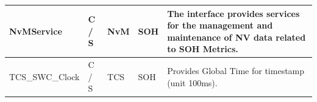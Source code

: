 \begin{longtable}{|l|l|l|l|l|}
\begin{minipage}{0.39\linewidth}\raggedright\vspace{.75ex}NvMService\vspace{.75ex}\end{minipage} & \begin{minipage}{0.07\linewidth}\raggedright\vspace{.75ex}C / S\vspace{.75ex}\end{minipage} & \begin{minipage}{0.11\linewidth}\raggedright\vspace{.75ex}NvM\vspace{.75ex}\end{minipage} & \begin{minipage}{0.11\linewidth}\raggedright\vspace{.75ex}SOH\vspace{.75ex}\end{minipage} & \begin{minipage}{0.16\linewidth}\raggedright\vspace{.75ex}The interface provides services for the management and maintenance of NV data related to SOH Metrics.\vspace{.75ex}\end{minipage}\\\hline
\begin{minipage}{0.39\linewidth}\raggedright\vspace{.75ex}TCS\_SWC\_Clock\vspace{.75ex}\end{minipage} & \begin{minipage}{0.07\linewidth}\raggedright\vspace{.75ex}C / S\vspace{.75ex}\end{minipage} & \begin{minipage}{0.11\linewidth}\raggedright\vspace{.75ex}TCS\vspace{.75ex}\end{minipage} & \begin{minipage}{0.11\linewidth}\raggedright\vspace{.75ex}SOH\vspace{.75ex}\end{minipage} & \begin{minipage}{0.16\linewidth}\raggedright\vspace{.75ex}Provides Global Time for timestamp (unit 100ms).\vspace{.75ex}\end{minipage}\\\hline

\end{longtable}
